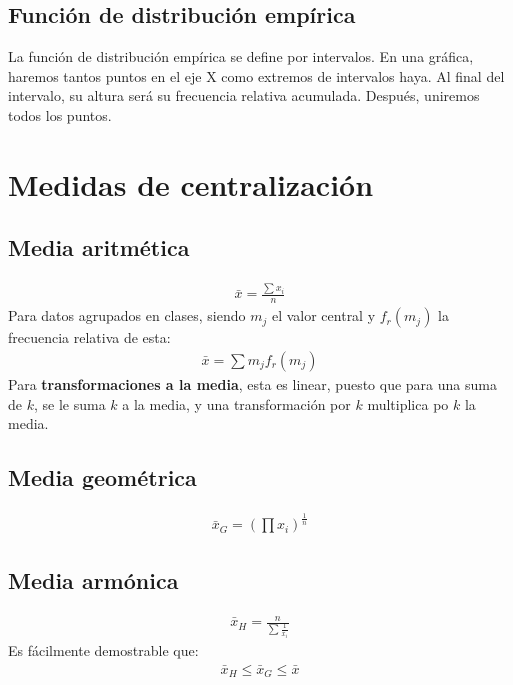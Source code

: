 \documentclass{article}
\begin{document}
\subsection{Función de distribución empírica}
La función de distribución empírica se define por intervalos. En una gráfica, haremos tantos
puntos en el eje X como extremos de intervalos haya. Al final del intervalo, su altura será
su frecuencia relativa acumulada. Después, uniremos todos los puntos.
\section{Medidas de centralización}
\subsection{Media aritmética}
\begin{equation}
    \begin{split}
        \bar{x}=\frac{\sum x_i}{n}
    \end{split}
\end{equation}
Para datos agrupados en clases, siendo $m_j$ el valor central y $f_r(m_j)$ la frecuencia relativa de esta:
\begin{equation}
    \begin{split}
        \bar{x}=\sum m_j f_r(m_j)
    \end{split}
\end{equation}
Para \textbf{transformaciones a la media}, esta es linear, puesto que para una suma de $k$, se le suma $k$ a la media,
y una transformación por $k$ multiplica po $k$ la media.
\subsection{Media geométrica}
\begin{equation}
    \begin{split}
        \bar{x}_G = (\prod x_i)^{\frac{1}{n}}
    \end{split}
\end{equation}
\subsection{Media armónica}
\begin{equation}
    \begin{split}
        \bar{x}_H=\frac{n}{\sum \frac{1}{x_{i}}}
    \end{split}
\end{equation}
Es fácilmente demostrable que:
\begin{equation}
    \begin{split}
        \bar{x}_H\leq\bar{x}_G\leq\bar{x}
    \end{split}
\end{equation}
\end{document}
